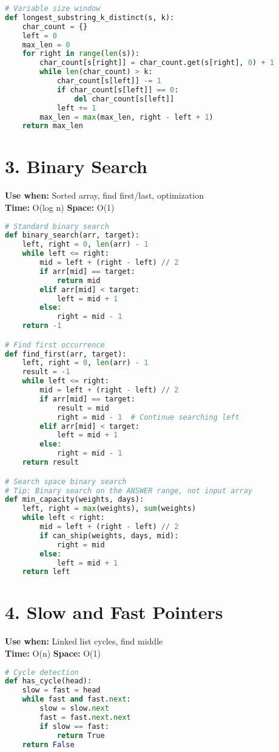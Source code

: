 \documentclass[8pt,landscape]{article}
\begin{document}
\begin{multicols}{3}
\begin{lstlisting}[language=Python]
# Variable size window
def longest_substring_k_distinct(s, k):
    char_count = {}
    left = 0
    max_len = 0
    for right in range(len(s)):
        char_count[s[right]] = char_count.get(s[right], 0) + 1
        while len(char_count) > k:
            char_count[s[left]] -= 1
            if char_count[s[left]] == 0:
                del char_count[s[left]]
            left += 1
        max_len = max(max_len, right - left + 1)
    return max_len
\end{lstlisting}

\section*{3. Binary Search}
\textbf{Use when:} Sorted array, find first/last, optimization \\
\textbf{Time:} O(log n) \quad \textbf{Space:} O(1)
\begin{lstlisting}[language=Python]
# Standard binary search
def binary_search(arr, target):
    left, right = 0, len(arr) - 1
    while left <= right:
        mid = left + (right - left) // 2
        if arr[mid] == target:
            return mid
        elif arr[mid] < target:
            left = mid + 1
        else:
            right = mid - 1
    return -1

# Find first occurrence
def find_first(arr, target):
    left, right = 0, len(arr) - 1
    result = -1
    while left <= right:
        mid = left + (right - left) // 2
        if arr[mid] == target:
            result = mid
            right = mid - 1  # Continue searching left
        elif arr[mid] < target:
            left = mid + 1
        else:
            right = mid - 1
    return result

# Search space binary search
# Tip: Binary search on the ANSWER range, not input array
def min_capacity(weights, days):
    left, right = max(weights), sum(weights)
    while left < right:
        mid = left + (right - left) // 2
        if can_ship(weights, days, mid):
            right = mid
        else:
            left = mid + 1
    return left
\end{lstlisting}

\section*{4. Slow and Fast Pointers}
\textbf{Use when:} Linked list cycles, find middle \\
\textbf{Time:} O(n) \quad \textbf{Space:} O(1)
\begin{lstlisting}[language=Python]
# Cycle detection
def has_cycle(head):
    slow = fast = head
    while fast and fast.next:
        slow = slow.next
        fast = fast.next.next
        if slow == fast:
            return True
    return False


\end{lstlisting}
\end{multicols}
\end{document}
